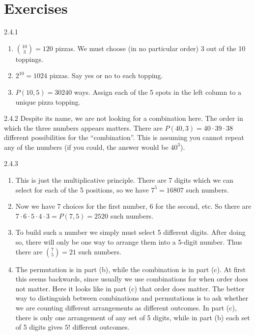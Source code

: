 \documentclass[11pt,]{book}
\theoremstyle{ptxplainnotitle}
\theoremstyle{ptxplaintitle}
\theoremstyle{ptxdefinitionnotitle}
\theoremstyle{ptxdefinitiontitle}
\theoremstyle{ptxdefinitionnotitle}
\theoremstyle{ptxdefinitiontitle}
\theoremstyle{ptxdefinitionnotitle}
\theoremstyle{ptxdefinitiontitle}
\theoremstyle{ptxdefinitiontitlenonumber}
\theoremstyle{ptxdefinitiontitlenonumber}
\numberwithin{equation}{chapter}
\begin{document}
\section*{Exercises}
\begin{divisionexercise}{2.4.1}
\textbf{}\hypertarget{p-1509}{}%
\leavevmode%
\begin{enumerate}[label=(\alph*)]
\item\hypertarget{li-654}{}\hypertarget{p-1510}{}%
\({10 \choose 3} = 120\) pizzas.  We must choose (in no particular order) 3 out of the 10 toppings.%
\item\hypertarget{li-655}{}\hypertarget{p-1511}{}%
\(2^{10} = 1024\) pizzas.  Say yes or no to each topping.%
\item\hypertarget{li-656}{}\hypertarget{p-1512}{}%
\(P(10,5) = 30240\) ways.  Assign each of the 5 spots in the left column to a unique pizza topping.%
\end{enumerate}
%
\end{divisionexercise}%
\begin{divisionexercise}{2.4.2}
\textbf{}\hypertarget{p-1518}{}%
Despite its name, we are not looking for a combination here. The order in which the three numbers appears matters. There are \(P(40,3) = 40\cdot 39 \cdot 38\) different possibilities for the ``combination''. This is assuming you cannot repeat any of the numbers (if you could, the answer would be \(40^3\)).%
\end{divisionexercise}%
\begin{divisionexercise}{2.4.3}
\textbf{}\hypertarget{p-1542}{}%
\leavevmode%
\begin{enumerate}[label=(\alph*)]
\item\hypertarget{li-669}{}\hypertarget{p-1543}{}%
This is just the multiplicative principle. There are 7 digits which we can select for each of the 5 positions, so we have \(7^5 = 16807\) such numbers.%
\item\hypertarget{li-670}{}\hypertarget{p-1544}{}%
Now we have 7 choices for the first number, 6 for the second, etc. So there are \(7 \cdot 6 \cdot 5 \cdot 4 \cdot 3 = P(7,5) = 2520\) such numbers.%
\item\hypertarget{li-671}{}\hypertarget{p-1545}{}%
To build such a number we simply must select 5 different digits. After doing so, there will only be one way to arrange them into a 5-digit number. Thus there are \({7 \choose 5} = 21\) such numbers.%
\item\hypertarget{li-672}{}\hypertarget{p-1546}{}%
The permutation is in part (b), while the combination is in part (c). At first this seems backwards, since usually we use combinations for when order does not matter. Here it looks like in part (c) that order does matter. The better way to distinguish between combinations and permutations is to ask whether we are counting different arrangements as different outcomes. In part (c), there is only one arrangement of any set of 5 digits, while in part (b) each set of 5 digits gives \(5!\) different outcomes.%
\end{enumerate}
%
\end{divisionexercise}%
\end{document}
